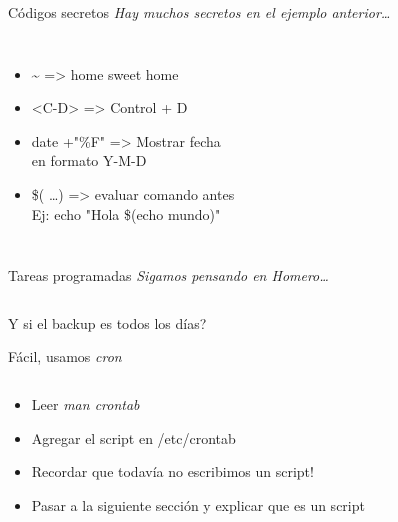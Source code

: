 \begin{frame}{C\'odigos secretos}
\textit{ Hay muchos secretos en el ejemplo anterior\ldots }
\bigskip
\begin{columns}[onlytextwidth]
	\begin{itemize}
		\item \alert{ \textasciitilde } => home sweet home
		\item \alert{ <C-D> } => Control + D
		\item \alert{ date +"\%F" } => Mostrar fecha \\ en formato Y-M-D
		\item \alert{ \$( \ldots ) } => evaluar comando antes \\
			Ej: echo "Hola \$(echo mundo)"
	\end{itemize}
\end{columns}
\end{frame}


\begin{frame}[t]{Tareas programadas}
\textit{ Sigamos pensando en Homero\ldots }
\begin{columns}[onlytextwidth]
	\begin{itemize}
		\item \textquestiondown Y si el backup es todos los d\'ias?
		\only<2> {
			\item F\'acil, usamos \textit{ cron } \\
		}
	\end{itemize}
\end{columns}
				
 {
	\begin{itemize}
		\item Leer \textit{ man crontab }
		\item Agregar el script en /etc/crontab
		\item Recordar que todav\'ia no escribimos un script!
		\item Pasar a la siguiente secci\'on y explicar que es un script
	\end{itemize}
}
\end{frame}



